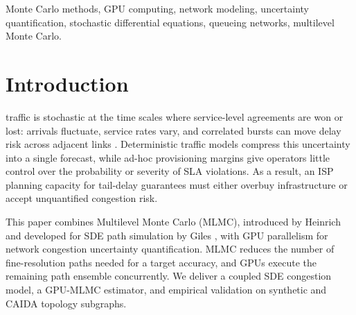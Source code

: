\documentclass[journal]{IEEEtran}
\begin{document}
\begin{IEEEkeywords}
Monte Carlo methods, GPU computing, network modeling, uncertainty quantification, stochastic
differential equations, queueing networks, multilevel Monte Carlo.
\end{IEEEkeywords}

\section{Introduction}

 traffic is stochastic at the time scales where service-level
agreements are won or lost: arrivals fluctuate, service rates vary, and correlated bursts can
move delay risk across adjacent links \cite{kelly2011stochastic,whitt2002,cisco2023annual}.
Deterministic traffic models compress this uncertainty into a single forecast, while ad-hoc
provisioning margins give operators little control over the probability or severity of SLA
violations. As a result, an ISP planning capacity for tail-delay guarantees must either overbuy
infrastructure or accept unquantified congestion risk.

This paper combines Multilevel Monte Carlo (MLMC), introduced by Heinrich
\cite{heinrich2001multilevel} and developed for SDE path simulation by Giles
\cite{giles2008multilevel}, with GPU parallelism for network congestion uncertainty
quantification. MLMC reduces the number of fine-resolution paths needed for a target accuracy,
and GPUs execute the remaining path ensemble concurrently. We deliver a coupled SDE congestion
model, a GPU-MLMC estimator, and empirical validation on synthetic and CAIDA topology subgraphs.
\end{document}
